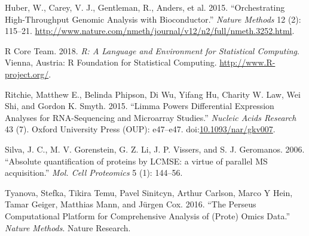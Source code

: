 \documentclass[]{article}
\begin{document}
\hypertarget{ref-bioconductor2015}{}
Huber, W., Carey, V. J., Gentleman, R., Anders, et al. 2015.
``Orchestrating High-Throughput Genomic Analysis with Bioconductor.''
\emph{Nature Methods} 12 (2): 115--21.
\url{http://www.nature.com/nmeth/journal/v12/n2/full/nmeth.3252.html}.

\hypertarget{ref-R2018}{}
R Core Team. 2018. \emph{R: A Language and Environment for Statistical
Computing}. Vienna, Austria: R Foundation for Statistical Computing.
\url{http://www.R-project.org/}.

\hypertarget{ref-ritchie2015}{}
Ritchie, Matthew E., Belinda Phipson, Di Wu, Yifang Hu, Charity W. Law,
Wei Shi, and Gordon K. Smyth. 2015. ``Limma Powers Differential
Expression Analyses for RNA-Sequencing and Microarray Studies.''
\emph{Nucleic Acids Research} 43 (7). Oxford University Press (OUP):
e47--e47.
doi:\href{https://doi.org/10.1093/nar/gkv007}{10.1093/nar/gkv007}.

\hypertarget{ref-silva2006}{}
Silva, J. C., M. V. Gorenstein, G. Z. Li, J. P. Vissers, and S. J.
Geromanos. 2006. ``Absolute quantification of proteins by LCMSE: a
virtue of parallel MS acquisition.'' \emph{Mol. Cell Proteomics} 5 (1):
144--56.

\hypertarget{ref-tyanova2016}{}
Tyanova, Stefka, Tikira Temu, Pavel Sinitcyn, Arthur Carlson, Marco Y
Hein, Tamar Geiger, Matthias Mann, and Jürgen Cox. 2016. ``The Perseus
Computational Platform for Comprehensive Analysis of (Prote) Omics
Data.'' \emph{Nature Methods}. Nature Research.
\end{document}
